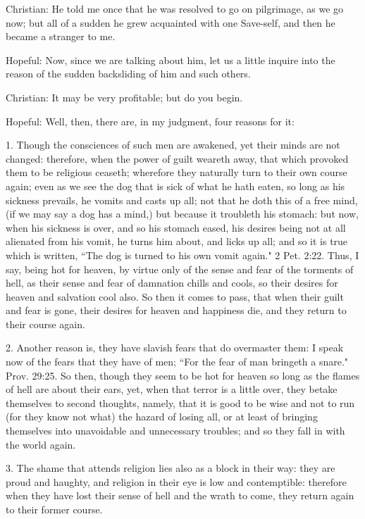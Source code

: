 Christian: He told me once that he was resolved to go on pilgrimage, as we go now; but all of a sudden he grew acquainted with one Save-self, and then he became a stranger to me.

Hopeful: Now, since we are talking about him, let us a little inquire into the reason of the sudden backsliding of him and such others.

Christian: It may be very profitable; but do you begin.

Hopeful: Well, then, there are, in my judgment, four reasons for it:

1. Though the consciences of such men are awakened, yet their minds are not changed: therefore, when the power of guilt weareth away, that which provoked them to be religious ceaseth; wherefore they naturally turn to their own course again; even as we see the dog that is sick of what he hath eaten, so long as his sickness prevails, he vomits and casts up all; not that he doth this of a free mind, (if we may say a dog has a mind,) but because it troubleth his stomach: but now, when his sickness is over, and so his stomach eased, his desires being not at all alienated from his vomit, he turns him about, and licks up all; and so it is true which is written, ``The dog is turned to his own vomit again." 2 Pet. 2:22. Thus, I say, being hot for heaven, by virtue only of the sense and fear of the torments of hell, as their sense and fear of damnation chills and cools, so their desires for heaven and salvation cool also. So then it comes to pass, that when their guilt and fear is gone, their desires for heaven and happiness die, and they return to their course again.

2. Another reason is, they have slavish fears that do overmaster them: I speak now of the fears that they have of men; ``For the fear of man bringeth a snare." Prov. 29:25. So then, though they seem to be hot for heaven so long as the flames of hell are about their ears, yet, when that terror is a little over, they betake themselves to second thoughts, namely, that it is good to be wise and not to run (for they know not what) the hazard of losing all, or at least of bringing themselves into unavoidable and unnecessary troubles; and so they fall in with the world again.

3. The shame that attends religion lies also as a block in their way: they are proud and haughty, and religion in their eye is low and contemptible: therefore when they have lost their sense of hell and the wrath to come, they return again to their former course.

